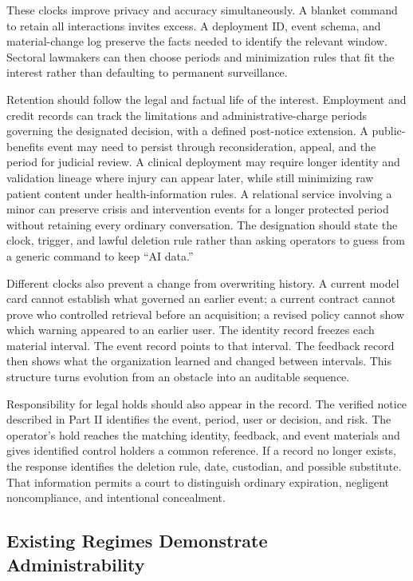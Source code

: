 These clocks improve privacy and accuracy simultaneously. A blanket command to retain all interactions invites excess. A deployment ID, event schema, and material-change log preserve the facts needed to identify the relevant window. Sectoral lawmakers can then choose periods and minimization rules that fit the interest rather than defaulting to permanent surveillance.

Retention should follow the legal and factual life of the interest. Employment and credit records can track the limitations and administrative-charge periods governing the designated decision, with a defined post-notice extension. A public-benefits event may need to persist through reconsideration, appeal, and the period for judicial review. A clinical deployment may require longer identity and validation lineage where injury can appear later, while still minimizing raw patient content under health-information rules. A relational service involving a minor can preserve crisis and intervention events for a longer protected period without retaining every ordinary conversation. The designation should state the clock, trigger, and lawful deletion rule rather than asking operators to guess from a generic command to keep ``AI data.''

Different clocks also prevent a change from overwriting history. A current model card cannot establish what governed an earlier event; a current contract cannot prove who controlled retrieval before an acquisition; a revised policy cannot show which warning appeared to an earlier user. The identity record freezes each material interval. The event record points to that interval. The feedback record then shows what the organization learned and changed between intervals. This structure turns evolution from an obstacle into an auditable sequence.

Responsibility for legal holds should also appear in the record. The verified notice described in Part II identifies the event, period, user or decision, and risk. The operator's hold reaches the matching identity, feedback, and event materials and gives identified control holders a common reference. If a record no longer exists, the response identifies the deletion rule, date, custodian, and possible substitute. That information permits a court to distinguish ordinary expiration, negligent noncompliance, and intentional concealment.

\subsection{Existing Regimes Demonstrate Administrability}

